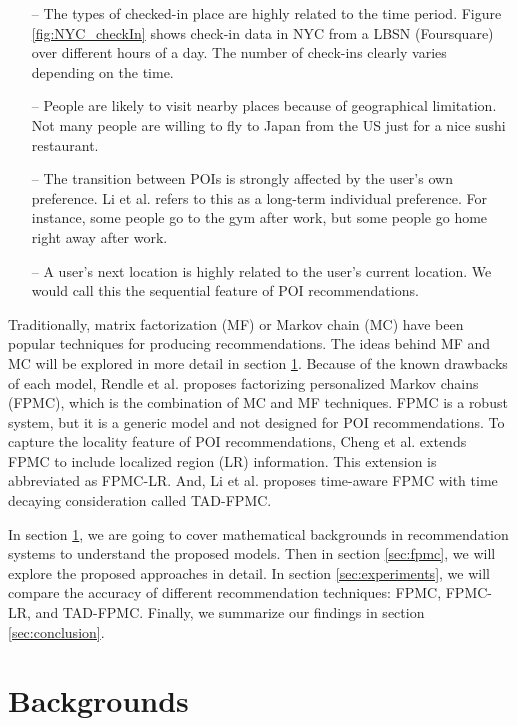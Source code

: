 \documentclass{sig-alternate}
\begin{document}
\begin{itemize}
\item[--] The types of checked-in place are highly related to the time period. Figure \ref{fig:NYC_checkIn} shows check-in data in 
NYC from a LBSN (Foursquare) over different hours of a day. The number of check-ins clearly varies depending 
on the time.
\item[--] People are likely to visit nearby places because of geographical limitation. Not many people are willing 
to fly to Japan from the US just for a nice sushi restaurant.
\item[--] The transition between POIs is strongly affected by the user's own preference. Li et al. \cite{Li:2017} refers to this as a long-term individual preference. For instance, some people go to the gym after work, but some people go home right away after work. 
\item[--] A user's next location is highly related to the user's current location. We would call this the sequential feature of POI recommendations. 
\end{itemize}



Traditionally, matrix factorization (MF) or Markov chain (MC) have been popular techniques for producing recommendations.
The ideas behind MF and MC will be explored in more detail in section \ref{sec:backgrounds}. 
Because of the known drawbacks of each model, Rendle et al. \cite{Rendle:2010:FPM} proposes factorizing personalized 
Markov chains (FPMC), which is the combination of MC and MF techniques. FPMC is a robust system, 
but it is a generic model and not designed for POI recommendations. To capture the locality feature of 
POI recommendations, Cheng et al. \cite{Cheng:2013} extends FPMC to include localized region (LR) information.  
This extension is abbreviated as FPMC-LR. 
And, Li et al. \cite{Li:2017} proposes time-aware FPMC with time decaying consideration called TAD-FPMC.

In section \ref{sec:backgrounds}, we are going to cover mathematical backgrounds in recommendation systems 
to understand the proposed models. Then in section \ref{sec:fpmc}, we will explore the proposed approaches in detail. 
In section \ref{sec:experiments}, we will compare the accuracy of different recommendation techniques: FPMC, FPMC-LR, and TAD-FPMC. 
Finally, we summarize our findings in section \ref{sec:conclusion}.



\section{Backgrounds}
\label{sec:backgrounds}
\end{document}
